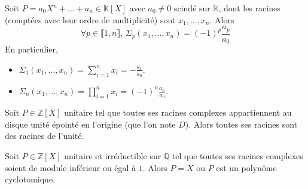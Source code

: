 	
	\begin{application}
		Soit $P = a_0X^n + \dots + a_n \in \mathbb{K}[X]$ avec $a_0 \neq 0$ scindé sur $\mathbb{K}$, dont les racines (comptées avec leur ordre de multiplicité) sont $x_1, \dots, x_n$. Alors
		\[ \forall p \in \llbracket 1, n \rrbracket, \, \Sigma_p(x_1, \dots, x_n) = (-1)^p \frac{a_p}{a_0} \]
		En particulier,
		\begin{itemize}
			\item $\Sigma_1(x_1, \dots, x_n) = \sum_{i=1}^n x_i = -\frac{a_1}{a_0}$.
			\item $\Sigma_n(x_1, \dots, x_n) = \prod_{i=1}^n x_i = (-1)^n \frac{a_n}{a_0}$.
		\end{itemize}
	\end{application}
	
	
	\begin{application}
		Soit $P \in \mathbb{Z}[X]$ unitaire tel que toutes ses racines complexes appartiennent au disque unité épointé en l'origine (que l'on note $D$). Alors toutes ses racines sont des racines de l'unité.
	\end{application}
	
	\begin{corollary}
		Soit $P \in \mathbb{Z}[X]$ unitaire et irréductible sur $\mathbb{Q}$ tel que toutes ses racines complexes soient de module inférieur ou égal à $1$. Alors $P = X$ ou $P$ est un polynôme cyclotomique.
	\end{corollary}

